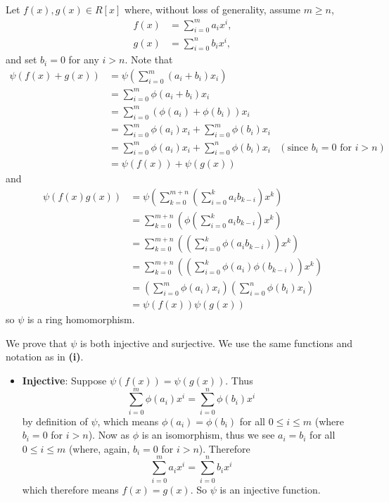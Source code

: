 \begin{questions}
    \item \begin{partquestions}{\roman*}
        \item Let $f(x), g(x) \in R[x]$ where, without loss of generality, assume $m \geq n$,
        \begin{align*}
            f(x) &= \sum_{i=0}^m a_ix^i,\\
            g(x) &= \sum_{i=0}^n b_ix^i,
        \end{align*}
        and set $b_i = 0$ for any $i > n$. Note that
        \begin{align*}
            \psi(f(x) + g(x)) &= \psi\left(\sum_{i=0}^m(a_i+b_i)x_i\right)\\
            &= \sum_{i=0}^m\phi(a_i + b_i)x_i\\
            &= \sum_{i=0}^m\left(\phi(a_i) + \phi(b_i)\right)x_i\\
            &= \sum_{i=0}^m\phi(a_i)x_i + \sum_{i=0}^m\phi(b_i)x_i\\
            &= \sum_{i=0}^m\phi(a_i)x_i + \sum_{i=0}^n\phi(b_i)x_i & (\text{since } b_i = 0 \text{ for } i > n)\\
            &= \psi(f(x)) + \psi(g(x))
        \end{align*}
        and
        \begin{align*}
            \psi(f(x)g(x)) &= \psi\left(\sum_{k=0}^{m+n}\left(\sum_{i=0}^ka_ib_{k-i}\right)x^k\right)\\
            &= \sum_{k=0}^{m+n}\left(\phi\left(\sum_{i=0}^ka_ib_{k-i}\right)x^k\right)\\
            &= \sum_{k=0}^{m+n}\left(\left(\sum_{i=0}^k\phi(a_ib_{k-i})\right)x^k\right)\\
            &= \sum_{k=0}^{m+n}\left(\left(\sum_{i=0}^k\phi(a_i)\phi(b_{k-i})\right)x^k\right)\\
            &= \left(\sum_{i=0}^m\phi(a_i)x_i\right)\left(\sum_{i=0}^n\phi(b_i)x_i\right)\\
            &= \psi(f(x))\psi(g(x))
        \end{align*}
        so $\psi$ is a ring homomorphism.

        \item We prove that $\psi$ is both injective and surjective. We use the same functions and notation as in \textbf{(i)}.
        \begin{itemize}
            \item \textbf{Injective}: Suppose $\psi(f(x)) = \psi(g(x))$. Thus
            \[
                \sum_{i=0}^m \phi(a_i)x^i = \sum_{i=0}^n \phi(b_i)x^i
            \]
            by definition of $\psi$, which means $\phi(a_i) = \phi(b_i)$ for all $0 \leq i \leq m$ (where $b_i = 0$ for $i > n$). Now as $\phi$ is an isomorphism, thus we see $a_i = b_i$ for all $0 \leq i \leq m$ (where, again, $b_i = 0$ for $i > n$). Therefore
            \[
                \sum_{i=0}^m a_ix^i = \sum_{i=0}^n b_ix^i
            \]
            which therefore means $f(x) = g(x)$. So $\psi$ is an injective function.


\end{itemize}
\end{partquestions}
\end{questions}
